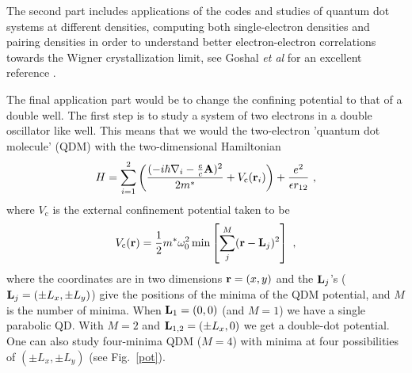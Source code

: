 \documentclass[twocolumn]{revtex4}
\begin{document}
The second part includes applications of the codes and studies of
quantum dot systems at different densities, computing both
single-electron densities and pairing densities in order to understand
better electron-electron correlations towards the Wigner
crystallization limit, see Goshal {\em et al} for an excellent
reference \cite{ghosal2007}.

The final application part would be to change the confining potential
to that of a double well. The first step is to study a system of two
electrons in a double oscillator like well.  This means that we would
the two-electron 'quantum dot molecule' (QDM) with the two-dimensional
Hamiltonian
\begin{equation}
H = \sum _{i=1}^2\left ( \frac{ ( {- i {\hbar} \nabla_i}
-\frac ec \mathbf{A})^2 }{2 m^{*}} + V_\mathrm{c}({\bf
r}_{i}) \right ) +  \frac {e^{2}}{ \epsilon   r_{12} } \ ,
\label{ham}
\end{equation}
where $V_\mathrm{c}$ is the external confinement potential
taken to be
\begin{equation}
 V_\mathrm{c}({\bf r}) = \frac 12 m^* \omega_0^2 \min \left[
 \sum_j^M ({\bf r} - {\bf L}_j)^2 \right] \ ,
\label{Vc}
\end{equation}
where the coordinates are in two dimensions ${\bf r} = (x,y)$ and the ${\bf
L}_j$'s (${\bf L}_j = (\pm L_x, \pm L_y)$) give the positions of the
minima of the QDM potential, and $M$ is the number of minima. When
${\bf L}_1=(0,0)$ (and $M=1$) we have a single parabolic QD. With
$M=2$ and ${\bf L}_{1,2} = (\pm L_x,0)$ we get a double-dot
potential. One can also study four-minima QDM ($M=4$) with minima at four
possibilities of $(\pm L_x,\pm L_y)$ (see Fig.~\ref{pot}).
%
\end{document}
